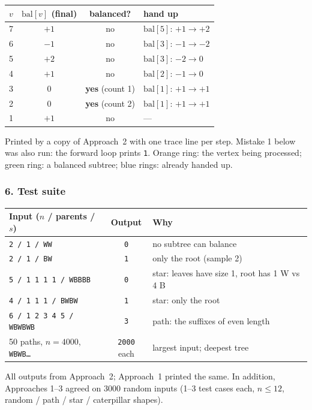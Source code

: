 \begin{tracebox}[{Sample 1: $a = (1,1,2,3,3,5)$, $s = \texttt{WBBWWBW}$, initial $\mathrm{bal} = (+1,-1,-1,+1,+1,-1,+1)$}]
\begin{center}
\begin{tabular}{@{}cccl@{}}
\toprule
$v$ & $\mathrm{bal}[v]$ (final) & balanced? & hand up \\
\midrule
7 & $+1$ & no & $\mathrm{bal}[5]$: $+1 \to +2$ \\
6 & $-1$ & no & $\mathrm{bal}[3]$: $-1 \to -2$ \\
5 & $+2$ & no & $\mathrm{bal}[3]$: $-2 \to 0$ \\
4 & $+1$ & no & $\mathrm{bal}[2]$: $-1 \to 0$ \\
3 & $0$ & \textbf{yes} (count 1) & $\mathrm{bal}[1]$: $+1 \to +1$ \\
2 & $0$ & \textbf{yes} (count 2) & $\mathrm{bal}[1]$: $+1 \to +1$ \\
1 & $+1$ & no & --- \\
\bottomrule
\end{tabular}
\end{center}
Printed by a copy of Approach~2 with one trace line per step. Mistake 1 below was also run: the forward loop prints \texttt{1}. Orange ring: the vertex being processed; green ring: a balanced subtree; blue rings: already handed up.
\end{tracebox}

\subsubsection*{6. Test suite}

\begin{testbox}
\centering\small
\begin{tabular}{@{}p{5.2cm}cp{6.4cm}@{}}
\toprule
\textbf{Input ($n$ / parents / $s$)} & \textbf{Output} & \textbf{Why} \\
\midrule
\texttt{2 / 1 / WW} & \texttt{0} & no subtree can balance \\
\texttt{2 / 1 / BW} & \texttt{1} & only the root (sample 2) \\
\texttt{5 / 1 1 1 1 / WBBBB} & \texttt{0} & star: leaves have size 1, root has 1 W vs 4 B \\
\texttt{4 / 1 1 1 / BWBW} & \texttt{1} & star: only the root \\
\texttt{6 / 1 2 3 4 5 / WBWBWB} & \texttt{3} & path: the suffixes of even length \\
50 paths, $n = 4000$, \texttt{WBWB\dots} & \texttt{2000} each & largest input; deepest tree \\
\bottomrule
\end{tabular}
\end{testbox}
All outputs from Approach~2; Approach~1 printed the same. In addition, Approaches 1--3 agreed on $3000$ random inputs (1--3 test cases each, $n \le 12$, random / path / star / caterpillar shapes).

